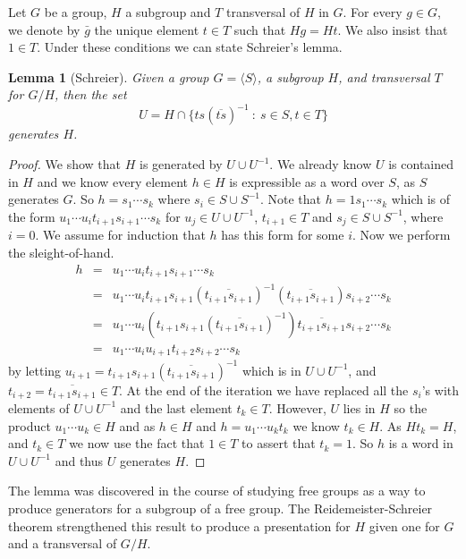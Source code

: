 \documentclass[12pt]{article}
\newtheorem{lemma}[thm]{Lemma}
\providecommand{\union}{\cup}
\providecommand{\intersect}{\cap}
\begin{document}
Let $G$ be a group, $H$ a subgroup and $T$ transversal of $H$ in $G$.  For every $g\in G$,
 we denote by $\bar{g}$ the unique element $t\in T$ such that $Hg=Ht$.
We also insist that $1\in T$.  Under these conditions we can state Schreier's lemma.

\begin{lemma}[Schreier]\label{lem:schreier}
Given a group $G=\langle S\rangle$, a subgroup $H$, and transversal
$T$ for $G/H$, then the set 
\[U=H\intersect\{ts(\overline{ts})^{-1}~:~s\in S,t\in T\}\]
generates $H$.
\end{lemma}

\begin{proof}\cite{Seress}
We show that $H$ is generated by $U\union U^{-1}$.  We already know $U$
is contained in $H$ and we know every element $h\in H$ is expressible as
a word over $S$, as $S$ generates $G$.  So $h=s_1\cdots s_k$ where 
$s_i\in S\union S^{-1}$.  Note that $h=1s_1\cdots s_k$ which is of
the form $u_1\cdots u_i t_{i+1}s_{i+1}\cdots s_k$ for $u_j\in U\union U^{-1}$,
$t_{i+1}\in T$ and $s_j\in S\union S^{-1}$, where $i=0$.  We assume for
induction that $h$ has this form for some $i$.  Now we perform the 
sleight-of-hand.
\begin{eqnarray*}
h & = & u_1\cdots u_i t_{i+1}s_{i+1}\cdots s_k\\
	& = & u_1\cdots u_i t_{i+1}s_{i+1}
	(\overline{t_{i+1}s_{i+1}})^{-1}(\overline{t_{i+1}s_{i+1}})s_{i+2}\cdots s_k\\
	& = & u_1\cdots u_i (t_{i+1}s_{i+1}(\overline{t_{i+1}s_{i+1}})^{-1})
		\overline{t_{i+1}s_{i+1}}s_{i+2}\cdots s_k\\
	& = & u_1\cdots u_i u_{i+1}t_{i+2}s_{i+2}\cdots s_k
\end{eqnarray*}
by letting $u_{i+1}=t_{i+1}s_{i+1}(\overline{t_{i+1}s_{i+1}})^{-1}$ which is
in $U\union U^{-1}$, and $t_{i+2}=\overline{t_{i+1}s_{i+1}}\in T$.  At the
end of the iteration we have replaced all the $s_i$'s with elements of
$U\union U^{-1}$ and the last element $t_{k}\in T$.  However, $U$ lies in
$H$ so the product $u_1\cdots u_k\in H$ and as $h\in H$ and $h=u_1\cdots u_kt_k$
we know $t_k\in H$.  As $Ht_k=H$, and $t_k\in T$ we now use the fact
that $1\in T$ to assert that $t_k=1$.  So $h$ is a word in $U\union U^{-1}$
and thus $U$ generates $H$.
\end{proof}


The lemma was discovered in the course of studying free groups as a way to produce generators 
for a subgroup of a free group.  The Reidemeister-Schreier 
theorem strengthened this result to produce a presentation for $H$ given one
for $G$ and a transversal of $G/H$.
\end{document}

